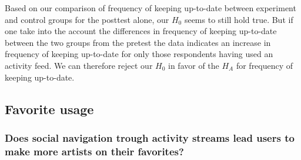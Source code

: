 \parabreak


\parabreak

Based on our comparison of frequency of keeping up-to-date between experiment
and control groups for the posttest alone, our $H_0$ seems to still hold true.
But if one take into the account the differences in frequency of keeping
up-to-date between the two groups from the pretest the data indicates
an increase in frequency of keeping up-to-date for only those respondents
having used an activity feed. We can therefore reject our $H_0$ in favor
of the $H_A$ for frequency of keeping up-to-date.


\subsection{Favorite usage}

\subsubsection{%
  Does social navigation trough activity streams lead users to make
  more artists on \urort{} their favorites?
}

